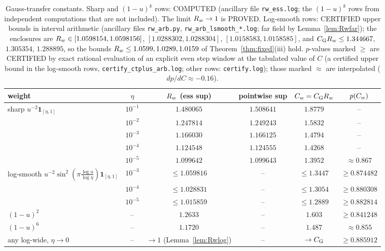 \begin{table}[ht]
\centering\footnotesize\setlength{\tabcolsep}{3pt}
\begin{tabular}{@{}lccccc@{}}
\hline
weight & $\eta$ & $R_w$ (ess sup) & pointwise sup & $C_w=C_{\mathrm G}R_w$ & $p(C_w)$\\
\hline
sharp $u^{-2}\mathbf 1_{[\eta,1]}$ & $10^{-1}$ & $1.480065$ & $1.508641$ & $1.8779$ & --\\
 & $10^{-2}$ & $1.247814$ & $1.249243$ & $1.5832$ & --\\
 & $10^{-3}$ & $1.166030$ & $1.166125$ & $1.4794$ & --\\
 & $10^{-4}$ & $1.124548$ & $1.124555$ & $1.4268$ & --\\
 & $10^{-5}$ & $1.099642$ & $1.099643$ & $1.3952$ & $\approx0.867$\\
log-smooth $u^{-2}\sin^2(\pi\frac{\log u}{\log\eta})\mathbf 1_{[\eta,1]}$ & $10^{-3}$ & $\le1.059816$ & -- & $\le1.3447$ & $\ge0.874482$\\
 & $10^{-4}$ & $\le1.028831$ & -- & $\le1.3054$ & $\ge0.880308$\\
 & $10^{-5}$ & $\le1.015859$ & -- & $\le1.2889$ & $\ge0.882814$\\
$(1-u)^2$ & -- & $1.2633$ & -- & $1.603$ & $\ge0.841248$\\
$(1-u)^6$ & -- & $1.1720$ & -- & $1.487$ & $\approx0.855$\\
any log-wide, $\eta\to0$ & -- & $\to1$ (Lemma~\ref{lem:Rwlog}) & -- & $\to C_{\mathrm G}$ & $\ge0.885912$\\
\hline
\end{tabular}
\caption{Gauss-transfer constants. Sharp and $(1-u)^k$ rows: COMPUTED (ancillary file \texttt{rw\_ess.log}; the $(1-u)^k$ rows from
independent computations that are not included). The limit $R_w\to1$ is PROVED. Log-smooth rows: CERTIFIED upper bounds in interval
arithmetic (ancillary files \texttt{rw\_arb.py}, \texttt{rw\_arb\_lsmooth\_*.log}; far field by Lemma~\ref{lem:Rwfar}); the enclosures are
$R_w\in[1.0598154,1.0598156]$, $[1.0288302,1.0288304]$, $[1.0158583,1.0158585]$, and $C_{\mathrm G}R_w\le1.344667$, $1.305354$, $1.288895$, so the
bounds $R_w\le1.0599,1.0289,1.0159$ of Theorem~\ref{thm:fixed}(iii) hold.
$p$-values marked $\ge$ are CERTIFIED by exact rational evaluation of an explicit even step window at the tabulated value of $C$
(a certified upper bound in the log-smooth rows, \texttt{certify\_ctplus\_arb.log}; other rows: \texttt{certify.log}); those marked $\approx$ are interpolated
($dp/dC\approx-0.16$).}
\label{tab:Rw}
\end{table}

